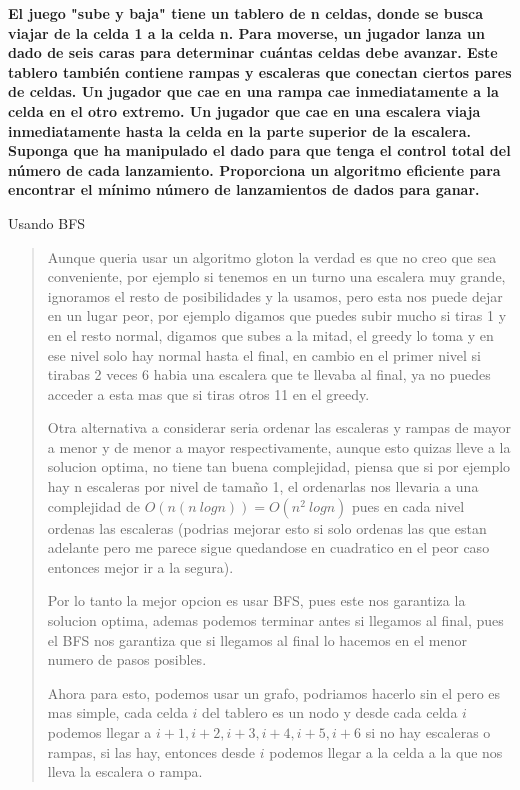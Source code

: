 \textbf{
    El juego "sube y baja" tiene un tablero de n celdas, donde se busca viajar de la celda 1 a la celda n. Para moverse, un jugador lanza un dado de seis caras para determinar cuántas celdas debe avanzar. Este tablero también contiene rampas y escaleras que conectan ciertos pares de celdas. Un jugador que cae en una rampa cae inmediatamente a la celda en el otro extremo. Un jugador que  cae en una escalera viaja inmediatamente hasta la celda en la parte superior de la escalera. Suponga que ha manipulado el dado para que tenga el control total del número de cada lanzamiento. Proporciona un algoritmo eficiente para encontrar el mínimo número de lanzamientos de dados para ganar.
}\vspace{.2cm}

\textcolor{bibi}{Usando BFS}
\begin{quote}
    Aunque queria usar un algoritmo gloton la verdad es que no creo que sea conveniente, por ejemplo si tenemos en un turno una escalera muy grande, ignoramos el resto de posibilidades y la usamos, pero esta nos puede dejar en un lugar peor, por ejemplo digamos que puedes subir mucho si tiras 1 y en el resto normal, digamos que subes a la mitad, el greedy lo toma y en ese nivel solo hay normal hasta el final, en cambio en el primer nivel si tirabas 2 veces 6 habia una escalera que te llevaba al final, ya no puedes acceder a esta mas que si tiras otros 11 en el greedy. \vspace{.2cm}

    Otra alternativa a considerar seria ordenar las escaleras y rampas de mayor a menor y de menor a mayor respectivamente, aunque esto quizas lleve a la solucion optima, no tiene tan buena complejidad, piensa que si por ejemplo hay n escaleras por nivel de tamaño 1, el ordenarlas nos llevaria a una complejidad de $O(n(n \ logn))= O(n^2 \ logn) $ pues en cada nivel ordenas las escaleras (podrias mejorar esto si solo ordenas las que estan adelante pero me parece sigue quedandose en cuadratico en el peor caso entonces mejor ir a la segura). \vspace{.2cm}

    Por lo tanto la mejor opcion es usar BFS, pues este nos garantiza la solucion optima, ademas podemos terminar antes si llegamos al final, pues el BFS nos garantiza que si llegamos al final lo hacemos en el menor numero de pasos posibles. \vspace{.2cm}

    Ahora para esto, podemos usar un grafo, podriamos hacerlo sin el pero es mas simple, cada celda $i$ del tablero es un nodo y desde cada celda $i$ podemos llegar a $i+1,i+2,i+3,i+4,i+5,i+6$ si no hay escaleras o rampas, si las hay, entonces desde $i$ podemos llegar a la celda a la que nos lleva la escalera o rampa. \vspace{.2cm}


\end{quote}

